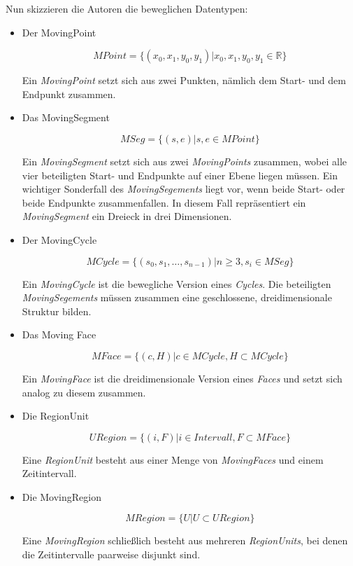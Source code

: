 Nun skizzieren die Autoren die beweglichen Datentypen:

\begin{itemize}

\item Der MovingPoint

$$MPoint=\{(x_0,x_1,y_0,y_1)|x_0,x_1,y_0,y_1\in \mathbb{R}\}$$

Ein \textit{MovingPoint} setzt sich aus zwei Punkten, nämlich dem Start- und dem Endpunkt zusammen.

\item Das MovingSegment 

$$MSeg=\{(s,e)|s,e\in MPoint\}$$

Ein \textit{MovingSegment} setzt sich aus zwei \textit{MovingPoints} zusammen, wobei alle vier beteiligten Start- und Endpunkte auf einer Ebene liegen müssen. Ein wichtiger Sonderfall des \textit{MovingSegements} liegt vor, wenn beide Start- oder beide Endpunkte zusammenfallen. In diesem Fall repräsentiert ein \textit{MovingSegment} ein Dreieck in drei Dimensionen.

\item Der MovingCycle 

$$MCycle=\{(s_0,s_1,\hdots ,s_{n-1})|n\geq3, s_i\in MSeg\}$$

Ein \textit{MovingCycle} ist die bewegliche Version eines \textit{Cycles}. Die beteiligten \textit{MovingSegements} müssen zusammen eine geschlossene, dreidimensionale Struktur bilden.

\item Das Moving Face 

$$MFace=\{(c,H)|c\in MCycle, H\subset MCycle\}$$

Ein \textit{MovingFace} ist die dreidimensionale Version eines \textit{Faces} und setzt sich analog zu diesem zusammen.

\item Die RegionUnit 

$$URegion=\{(i,F)|i\in Intervall, F\subset MFace\}$$

Eine \textit{RegionUnit} besteht aus einer Menge von \textit{MovingFaces} und einem Zeitintervall. 

\item Die MovingRegion 

$$MRegion=\{U|U\subset URegion\}$$

Eine \textit{MovingRegion} schließlich besteht aus mehreren \textit{RegionUnits}, bei denen die Zeitintervalle paarweise disjunkt sind.
\end{itemize}

